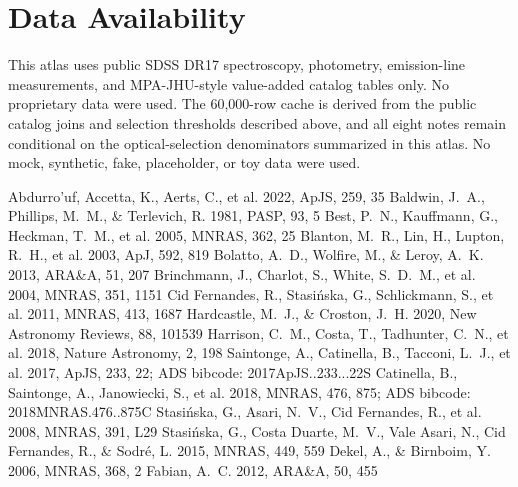 \documentclass[twocolumn]{aastex631}
\begin{document}
\section*{Data Availability}
This atlas uses public SDSS DR17 spectroscopy, photometry, emission-line measurements, and MPA-JHU-style value-added catalog tables only. No proprietary data were used. The 60,000-row cache is derived from the public catalog joins and selection thresholds described above, and all eight notes remain conditional on the optical-selection denominators summarized in this atlas. No mock, synthetic, fake, placeholder, or toy data were used.


\begin{thebibliography}{}
 Abdurro'uf, Accetta, K., Aerts, C., et al. 2022, ApJS, 259, 35
 Baldwin, J.~A., Phillips, M.~M., \& Terlevich, R. 1981, PASP, 93, 5
 Best, P.~N., Kauffmann, G., Heckman, T.~M., et al. 2005, MNRAS, 362, 25
 Blanton, M.~R., Lin, H., Lupton, R.~H., et al. 2003, ApJ, 592, 819
 Bolatto, A.~D., Wolfire, M., \& Leroy, A.~K. 2013, ARA\&A, 51, 207
 Brinchmann, J., Charlot, S., White, S.~D.~M., et al. 2004, MNRAS, 351, 1151
 Cid Fernandes, R., Stasi{\'n}ska, G., Schlickmann, S., et al. 2011, MNRAS, 413, 1687
 Hardcastle, M.~J., \& Croston, J.~H. 2020, New Astronomy Reviews, 88, 101539
 Harrison, C.~M., Costa, T., Tadhunter, C.~N., et al. 2018, Nature Astronomy, 2, 198
 Saintonge, A., Catinella, B., Tacconi, L.~J., et al. 2017, ApJS, 233, 22; ADS bibcode: 2017ApJS..233...22S
 Catinella, B., Saintonge, A., Janowiecki, S., et al. 2018, MNRAS, 476, 875; ADS bibcode: 2018MNRAS.476..875C
 Stasi{\'n}ska, G., Asari, N.~V., Cid Fernandes, R., et al. 2008, MNRAS, 391, L29
 Stasi{\'n}ska, G., Costa Duarte, M.~V., Vale Asari, N., Cid Fernandes, R., \& Sodr{\'e}, L. 2015, MNRAS, 449, 559
 Dekel, A., \& Birnboim, Y. 2006, MNRAS, 368, 2
 Fabian, A.~C. 2012, ARA\&A, 50, 455

\end{thebibliography}
\end{document}

